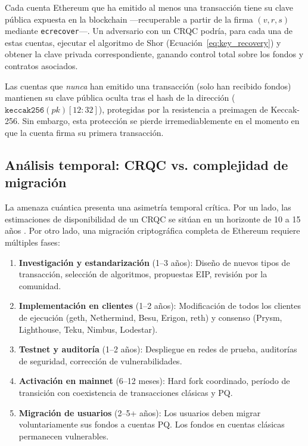 Cada cuenta Ethereum que ha emitido al menos una transacción tiene su clave pública expuesta en la blockchain ---recuperable a partir de la firma $(v, r, s)$ mediante \texttt{ecrecover}---. Un adversario con un CRQC podría, para cada una de estas cuentas, ejecutar el algoritmo de Shor (Ecuación~\ref{eq:key_recovery}) y obtener la clave privada correspondiente, ganando control total sobre los fondos y contratos asociados.

Las cuentas que \emph{nunca} han emitido una transacción (solo han recibido fondos) mantienen su clave pública oculta tras el hash de la dirección ($\texttt{keccak256}(\mathit{pk})[12{:}32]$), protegidas por la resistencia a preimagen de Keccak-256. Sin embargo, esta protección se pierde irremediablemente en el momento en que la cuenta firma su primera transacción.

\subsection{Análisis temporal: CRQC vs. complejidad de migración}

La amenaza cuántica presenta una asimetría temporal crítica. Por un lado, las estimaciones de disponibilidad de un CRQC se sitúan en un horizonte de 10 a 15 años \parencite{nistpqc2024}. Por otro lado, una migración criptográfica completa de Ethereum requiere múltiples fases:

\begin{enumerate}
  \item \textbf{Investigación y estandarización} (1--3 años): Diseño de nuevos tipos de transacción, selección de algoritmos, propuestas EIP, revisión por la comunidad.
  \item \textbf{Implementación en clientes} (1--2 años): Modificación de todos los clientes de ejecución (geth, Nethermind, Besu, Erigon, reth) y consenso (Prysm, Lighthouse, Teku, Nimbus, Lodestar).
  \item \textbf{Testnet y auditoría} (1--2 años): Despliegue en redes de prueba, auditorías de seguridad, corrección de vulnerabilidades.
  \item \textbf{Activación en mainnet} (6--12 meses): Hard fork coordinado, período de transición con coexistencia de transacciones clásicas y PQ.
  \item \textbf{Migración de usuarios} (2--5+ años): Los usuarios deben migrar voluntariamente sus fondos a cuentas PQ. Los fondos en cuentas clásicas permanecen vulnerables.
\end{enumerate}

